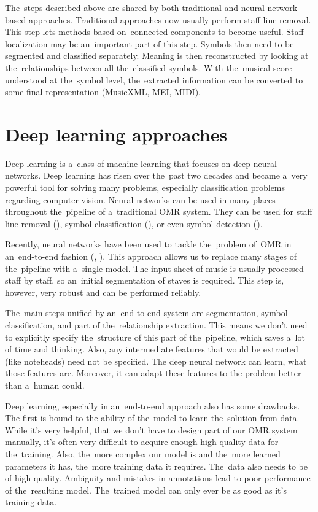 The~steps described above are shared by both traditional and neural network-based approaches. Traditional approaches now usually perform staff line removal. This step lets methods based on~connected components to become useful. Staff localization may be an~important part of this step. Symbols then need to be segmented and classified separately. Meaning is then reconstructed by looking at the~relationships between all the~classified symbols. With the~musical score understood at the~symbol level, the~extracted information can be converted to some final representation (MusicXML, MEI, MIDI).


\section{Deep learning approaches}

Deep learning is a~class of machine learning that focuses on deep neural networks. Deep learning has risen over the~past two decades and became a~very powerful tool for solving many problems, especially classification problems regarding computer vision. Neural networks can be used in many places throughout the~pipeline of a~traditional OMR system. They can be used for staff line removal (\cite{CalvoZaragoza2017}), symbol classification (\cite{Lee2016}), or even symbol detection (\cite{Pacha2018}).

Recently, neural networks have been used to tackle the~problem of~OMR in an~end-to-end fashion (\cite{Primus}, \cite{HmrBaseline}). This approach allows us to replace many stages of the~pipeline with a~single model. The input sheet of music is usually processed staff by staff, so an~initial segmentation of staves is required. This step is, however, very robust and can be performed reliably.

The~main steps unified by an~end-to-end system are segmentation, symbol classification, and part of the~relationship extraction. This means we don't need to explicitly specify the~structure of this part of the~pipeline, which saves a~lot of time and thinking. Also, any intermediate features that would be extracted (like noteheads) need not be specified. The deep neural network can learn, what those features are. Moreover, it can adapt these features to the problem better than a~human could.

Deep learning, especially in an~end-to-end approach also has some drawbacks. The first is bound to the ability of the~model to learn the~solution from data. While it's very helpful, that we don't have to design part of our OMR system manually, it's often very difficult to acquire enough high-quality data for the~training. Also, the~more complex our model is and the~more learned parameters it has, the~more training data it requires. The~data also needs to be of high quality. Ambiguity and mistakes in annotations lead to poor performance of the~resulting model. The~trained model can only ever be as good as it's training data.

